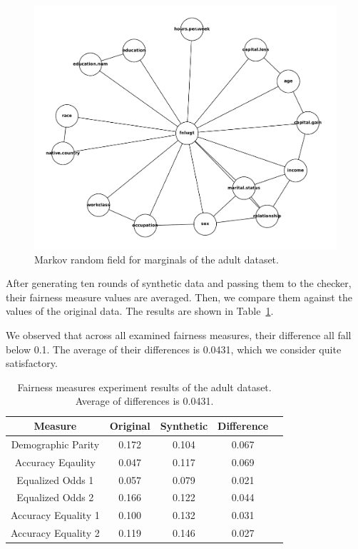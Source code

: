 \documentclass[manuscript,screen,review,anonymous]{acmart}
\begin{document}
\begin{figure}[h]
\centering
\includegraphics[width=\linewidth]{adult_mst}
\caption{Markov random field for marginals of the adult dataset.}
\label{fig:adult_mst}
\end{figure}

After generating ten rounds of synthetic data and passing them to the checker, their fairness measure values are averaged. Then, we compare them against the values of the original data. The results are shown in Table~\ref{tab:adult_score}.

We observed that across all examined fairness measures, their difference all fall below 0.1. The average of their differences is 0.0431, which we consider quite satisfactory.

\begin{table}[h]
\caption{Fairness measures experiment results of the adult dataset. Average of differences is 0.0431.}
\label{tab:adult_score}
\begin{tabular}{ccccc}
\toprule
\textbf{Measure} & \textbf{Original} & \textbf{Synthetic} & \textbf{Difference} \\
\midrule
Demographic Parity  & 0.172 & 0.104 & 0.067 \\
Accuracy Eqaulity   & 0.047 & 0.117 & 0.069 \\
Equalized Odds 1    & 0.057 & 0.079 & 0.021 \\
Equalized Odds 2    & 0.166 & 0.122 & 0.044 \\
Accuracy Equality 1 & 0.100 & 0.132 & 0.031 \\
Accuracy Equality 2 & 0.119 & 0.146 & 0.027 \\
\bottomrule
\end{tabular}
\end{table}
\end{document}
